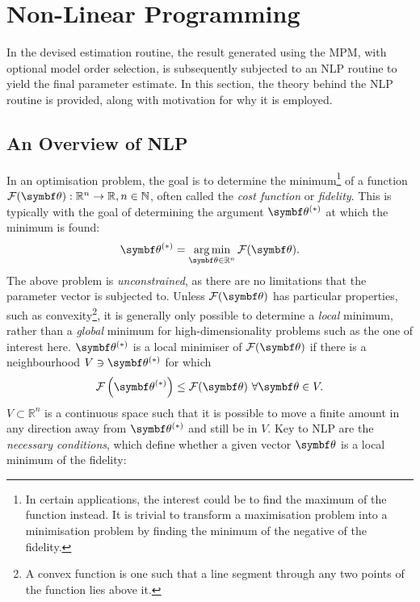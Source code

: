 \section{Non-Linear Programming}
\label{sec:nlp}
In the devised estimation routine, the result generated using the \ac{MPM},
with optional model order selection, is subsequently subjected to an \ac{NLP}
routine to yield the final parameter estimate. In this section, the theory
behind the \ac{NLP} routine is provided, along with motivation for why it
is employed.

\subsection{An Overview of \ac{NLP}}
\label{subsec:nlp-overview}
In an optimisation problem, the goal is to determine the minimum\footnote{
    In certain applications, the interest could be to find the maximum of
    the function instead. It is trivial to transform a maximisation problem into
    a minimisation problem by finding the minimum of the negative of the fidelity.
}
of a function $\Fth: \mathbb{R}^n \rightarrow \mathbb{R}, n \in \mathbb{N}$, often
called the \emph{cost function} or \emph{fidelity}.
This is typically with the goal of determining the argument $\bthstar$ at
which the minimum is found:
\begin{equation}
    \bthstar = \argmin_{\bth \in \mathbb{R}^n} \Fth.
    \label{eq:minF}
\end{equation}
The above problem is \emph{unconstrained}, as there are no limitations that the
parameter vector is subjected to. Unless $\Fth$ has particular properties, such
as convexity\footnote{
    A convex function is one such that a line segment through any two points of
    the function lies above it.
}, it is generally only possible to determine a \emph{local} minimum,
rather than a \emph{global} minimum for high-dimensionality problems such as
the one of interest here. $\bthstar$ is a local
minimiser of $\Fth$ if there is a neighbourhood $V \ni \bthstar$ for which
\begin{equation}
    \Fthstar \leq \Fth\ \forall \bth \in V.
  \label{def:local-minimiser}
\end{equation}
$V \subset \mathbb{R}^n$ is a continuous space such that it is possible to move
a finite amount in any direction away from $\bthstar$ and still be in $V$.
Key to \ac{NLP} are the \emph{necessary conditions}, which define whether a
given vector $\bth$ is a local minimum of the fidelity:
